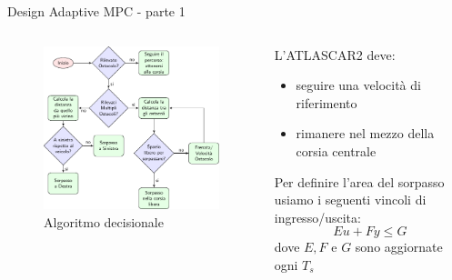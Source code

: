 \documentclass{beamer}
\renewcommand{\vec}[1]{\ensuremath{\boldsymbol{\mathit{#1}}}}
\begin{document}
	\begin{frame}{Design Adaptive MPC - parte 1} %
	\vspace{-1.3em}
	\begin{columns}[onlytextwidth,T]
		\hspace{-2.4em}
		\begin{column}[c]{0.72\textwidth}
		\begin{figure}[!h]
			\centering
			\includegraphics[width=
			\textwidth]{./images/flowchart/flowchart.pdf}
			\captionsetup{singlelinecheck = false, format= hang, justification=raggedright,}
			\caption{Algoritmo decisionale}
			\label{fig:flowchart}
		\end{figure}
		\end{column}	
		\hspace{1em}		
		\begin{column}[c]{0.4\textwidth}
		L'ATLASCAR2 deve:
		\begin{itemize}
		\item seguire una velocità di riferimento
		\item rimanere nel mezzo della corsia centrale
		\end{itemize}
		\vspace{1.4em}
		Per definire l'area del sorpasso usiamo i seguenti vincoli di ingresso/uscita:
		\begin{equation*}
		\label{eqn:mixed_IO_constraints}
		\vec{E}\vec{u}+\vec{F}\vec{y}\leq \vec{G}
		\end{equation*}
		dove $\vec{E},\vec{F}$ e $\vec{G}$ sono aggiornate ogni $T_s$
		\end{column}
	\end{columns}
	\end{frame}
	
\end{document}
